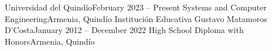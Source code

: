 \resumeSubHeadingListStart
    \resumeSubheading
        {Universidad del Quindío}{February 2023 -- Present}
        {Systems and Computer Engineering}{Armenia, Quindío}
    \resumeSubheading
        {Institución Educativa Gustavo Matamoros D'Costa}{January 2012 -- December 2022}
        {High School Diploma with Honors}{Armenia, Quindío}
\resumeSubHeadingListEnd
